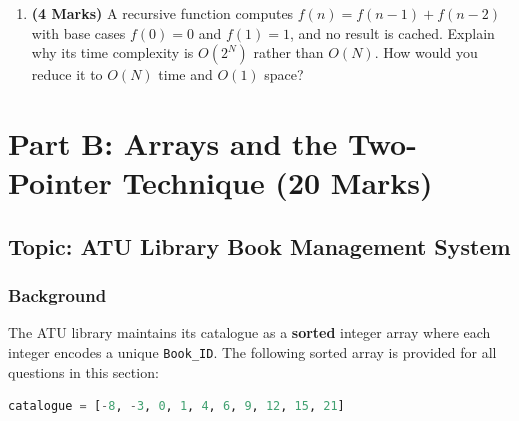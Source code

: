 \documentclass[11pt,a4paper]{article}
\begin{document}
\begin{enumerate}[label=\textbf{A\arabic*.}]
    \item \textbf{(4 Marks)} A recursive function computes $f(n) = f(n-1) + f(n-2)$ with base cases $f(0) = 0$ and $f(1) = 1$, and no result is cached. Explain why its time complexity is $O(2^N)$ rather than $O(N)$. How would you reduce it to $O(N)$ time and $O(1)$ space?
\end{enumerate}

\newpage

\section{Part B: Arrays and the Two-Pointer Technique (20 Marks)}
\subsection*{Topic: ATU Library Book Management System}

\subsubsection*{Background}
The ATU library maintains its catalogue as a \textbf{sorted} integer array where each integer encodes a unique \texttt{Book\_ID}. The following sorted array is provided for all questions in this section:

\begin{lstlisting}[language=Python]
catalogue = [-8, -3, 0, 1, 4, 6, 9, 12, 15, 21]
\end{lstlisting}
\end{document}
